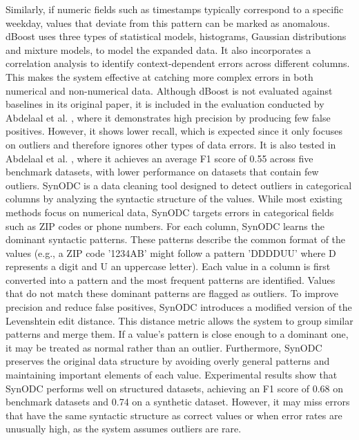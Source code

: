 Similarly, if numeric fields such as timestamps typically correspond to a specific weekday, values that deviate from this pattern can be marked as anomalous.
dBoost uses three types of statistical models, histograms, Gaussian distributions and mixture models, to model the expanded data. 
It also incorporates a correlation analysis to identify context-dependent errors across different columns. 
This makes the system effective at catching more complex errors in both numerical and non-numerical data. 
Although dBoost is not evaluated against baselines in its original paper, it is included in the evaluation conducted by Abdelaal et al. \cite{REIN}, where it demonstrates high precision by producing few false positives. 
However, it shows lower recall, which is expected since it only focuses on outliers and therefore ignores other types of data errors. 
It is also tested in Abdelaal et al. \cite{SAGED}, where it achieves an average F1 score of 0.55 across five benchmark datasets, with lower performance on datasets that contain few outliers.
\newline\newline
SynODC \cite{SYNODC} is a data cleaning tool designed to detect outliers in categorical columns by analyzing the syntactic structure of the values. 
While most existing methods focus on numerical data, SynODC targets errors in categorical fields such as ZIP codes or phone numbers. 
For each column, SynODC learns the dominant syntactic patterns. 
These patterns describe the common format of the values (e.g., a ZIP code '1234AB' might follow a pattern 'DDDDUU' where D represents a digit and U an uppercase letter). 
Each value in a column is first converted into a pattern and the most frequent patterns are identified. 
Values that do not match these dominant patterns are flagged as outliers. 
To improve precision and reduce false positives, SynODC introduces a modified version of the Levenshtein edit distance. 
This distance metric allows the system to group similar patterns and merge them. 
If a value's pattern is close enough to a dominant one, it may be treated as normal rather than an outlier. 
Furthermore, SynODC preserves the original data structure by avoiding overly general patterns and maintaining important elements of each value. 
Experimental results show that SynODC performs well on structured datasets, achieving an F1 score of 0.68 on benchmark datasets and 0.74 on a synthetic dataset. 
However, it may miss errors that have the same syntactic structure as correct values or when error rates are unusually high, as the system assumes outliers are rare.
